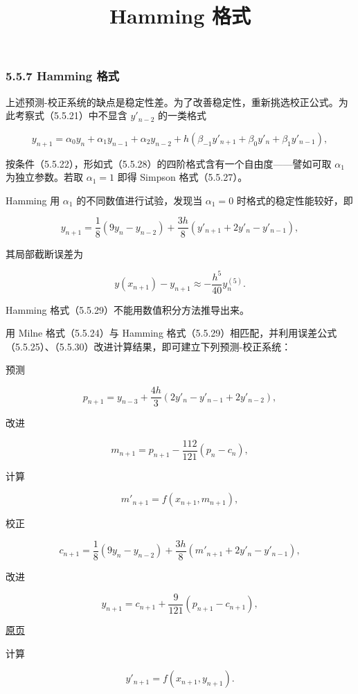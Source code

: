 \documentclass[
  10pt,
  fontset=fandol]{ctexart}
\title{Hamming 格式}
\author{}
\date{}
\begin{document}
\maketitle

\subsubsection{5.5.7 Hamming 格式}\label{hamming-ux683cux5f0f}

上述预测-校正系统的缺点是稳定性差。为了改善稳定性，重新挑选校正公式。为此考察式（5.5.21）中不显含 \(y'_{n-2}\) 的一类格式

\[
y_{n+1}=\alpha_0y_n+\alpha_1y_{n-1}+\alpha_2y_{n-2}+h(\beta_{-1}y'_{n+1}+\beta_0y'_n+\beta_1y'_{n-1}),
\tag{5.5.28}
\]

按条件（5.5.22），形如式（5.5.28）的四阶格式含有一个自由度------譬如可取 \(\alpha_1\) 为独立参数。若取 \(\alpha_1=1\) 即得 Simpson 格式（5.5.27）。

Hamming 用 \(\alpha_1\) 的不同数值进行试验，发现当 \(\alpha_1=0\) 时格式的稳定性能较好，即

\[
y_{n+1}=\frac18(9y_n-y_{n-2})+\frac{3h}{8}(y'_{n+1}+2y'_n-y'_{n-1}),
\tag{5.5.29}
\]

其局部截断误差为

\[
y(x_{n+1})-y_{n+1}\approx-\frac{h^5}{40}y_n^{(5)}.
\tag{5.5.30}
\]

Hamming 格式（5.5.29）不能用数值积分方法推导出来。

用 Milne 格式（5.5.24）与 Hamming 格式（5.5.29）相匹配，并利用误差公式（5.5.25）、（5.5.30）改进计算结果，即可建立下列预测-校正系统：

预测

\[
p_{n+1}=y_{n-3}+\frac{4h}{3}(2y'_n-y'_{n-1}+2y'_{n-2}),
\]

改进

\[
m_{n+1}=p_{n+1}-\frac{112}{121}(p_n-c_n),
\]

计算

\[
m'_{n+1}=f(x_{n+1},m_{n+1}),
\]

校正

\[
c_{n+1}=\frac18(9y_n-y_{n-2})+\frac{3h}{8}(m'_{n+1}+2y'_n-y'_{n-1}),
\]

改进

\[
y_{n+1}=c_{n+1}+\frac9{121}(p_{n+1}-c_{n+1}),
\]

\href{../../source-images/pdf-145.jpeg}{原页}

计算

\[
y'_{n+1}=f(x_{n+1},y_{n+1}).
\]
\end{document}
